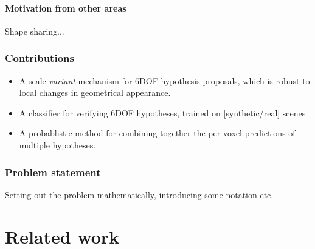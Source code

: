 \documentclass[10pt,a4paper, twocolumn]{article}
\makeatletter
\newcommand*{\eg}{e.g.\@\xspace}
\makeatother
\begin{document}




\paragraph{Motivation from other areas}
Shape sharing...

\subsubsection{Contributions}
\begin{itemize}
\item A scale-\emph{variant} mechanism for 6DOF hypothesis proposals, which is robust to local changes in geometrical appearance.
\item A classifier for verifying 6DOF hypotheses, trained on [synthetic/real] scenes
\item A probablistic method for combining together the per-voxel predictions of multiple hypotheses.
\end{itemize}

\subsubsection{Problem statement}

Setting out the problem mathematically, introducing some notation etc.



\section{Related work}
\end{document}
